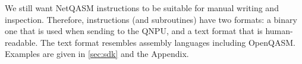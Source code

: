 We still want \ac{NetQASM} instructions to be suitable for manual writing and inspection.
Therefore, instructions (and subroutines) have two formats: a binary one that is used when sending to the \ac{QNPU}, and a text format that is human-readable.
The text format resembles assembly languages including OpenQASM.
Examples are given in \cref{sec:sdk} and the Appendix.





